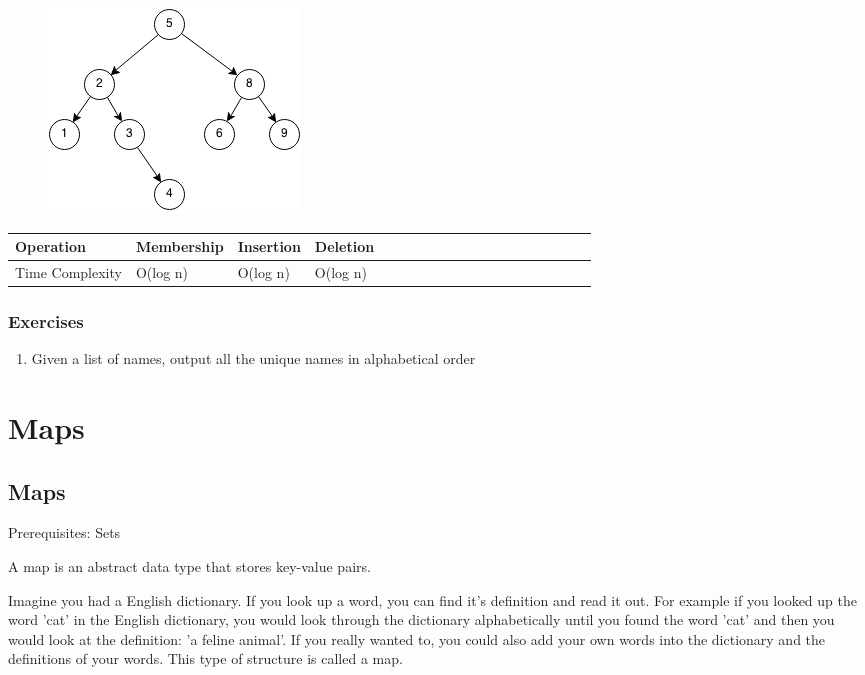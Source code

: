 \documentclass[11pt,oneside]{book}
\makeatletter
\def\maxwidth#1{\ifdim\Gin@nat@width>#1 #1\else\Gin@nat@width\fi}
\makeatother
\begin{document}
\vspace{5px}\begin{figure}[H]\centering
        \includegraphics[width=0.66\maxwidth{\textwidth}]{bst.png}
        \end{figure}

\vspace{10px}\begin{tabulary}{0.4\linewidth}{|l|l|l|l|l|l|l|l|l|l|l|l|l|l|l|l|l|l|l}\hline


  Operation &
  Membership &
  Insertion &
  Deletion\\
\hline


  Time Complexity &
  O(log n) &
  O(log n) &
  O(log n)\\

\hline\end{tabulary}

\subsection{Exercises}

\begin{enumerate}
\item Given a list of names, output all the unique names in alphabetical order
\end{enumerate}

    \chapter{ Maps }
        \section{ Maps }
        

Prerequisites: Sets

A map is an abstract data type that stores key-value pairs.

Imagine you had a English dictionary. If you look up a word, you can find it's definition and read it out. For example if you looked up the word 'cat' in the English dictionary, you would look through the dictionary alphabetically until you found the word 'cat' and then you would look at the definition: 'a feline animal'. If you really wanted to, you could also add your own words into the dictionary and the definitions of your words. This type of structure is called a map.
\end{document}

